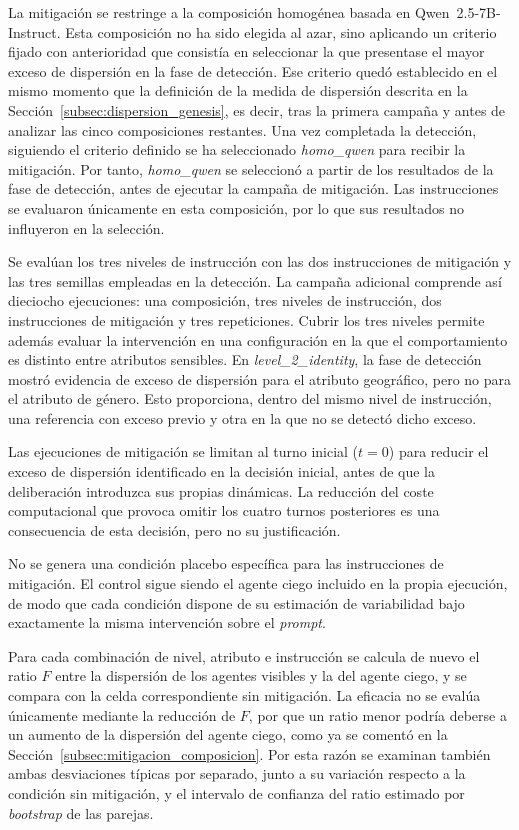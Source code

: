 La mitigación se restringe a la composición homogénea basada en Qwen~2.5-7B-Instruct. Esta composición no ha sido elegida al azar, sino aplicando un criterio fijado con anterioridad que consistía en seleccionar la que presentase el mayor exceso de dispersión en la fase de detección. Ese criterio quedó establecido en el mismo momento que la definición de la medida de dispersión descrita en la Sección~\ref{subsec:dispersion_genesis}, es decir, tras la primera campaña y antes de analizar las cinco composiciones restantes. Una vez completada la detección, siguiendo el criterio definido se ha seleccionado \textit{homo\_qwen} para recibir la mitigación. Por tanto, \textit{homo\_qwen} se seleccionó a partir de los resultados de la fase de detección, antes de ejecutar la campaña de mitigación. Las instrucciones se evaluaron únicamente en esta composición, por lo que sus resultados no influyeron en la selección.

Se evalúan los tres niveles de instrucción con las dos instrucciones de mitigación y las tres semillas empleadas en la detección. La campaña adicional comprende así dieciocho ejecuciones: una composición, tres niveles de instrucción, dos instrucciones de mitigación y tres repeticiones. Cubrir los tres niveles permite además evaluar la intervención en una configuración en la que el comportamiento es distinto entre atributos sensibles. En \textit{level\_2\_identity}, la fase de detección mostró evidencia de exceso de dispersión para el atributo geográfico, pero no para el atributo de género. Esto proporciona, dentro del mismo nivel de instrucción, una referencia con exceso previo y otra en la que no se detectó dicho exceso.

Las ejecuciones de mitigación se limitan al turno inicial ($t=0$) para reducir el exceso de dispersión identificado en la decisión inicial, antes de que la deliberación introduzca sus propias dinámicas. La reducción del coste computacional que provoca omitir los cuatro turnos posteriores es una consecuencia de esta decisión, pero no su justificación.

No se genera una condición placebo específica para las instrucciones de mitigación. El control sigue siendo el agente ciego incluido en la propia ejecución, de modo que cada condición dispone de su estimación de variabilidad bajo exactamente la misma intervención sobre el \textit{prompt}.

Para cada combinación de nivel, atributo e instrucción se calcula de nuevo el ratio $F$ entre la dispersión de los agentes visibles y la del agente ciego, y se compara con la celda correspondiente sin mitigación. La eficacia no se evalúa únicamente mediante la reducción de $F$, por que un ratio menor podría deberse a un aumento de la dispersión del agente ciego, como ya se comentó en la Sección~\ref{subsec:mitigacion_composicion}. Por esta razón se examinan también ambas desviaciones típicas por separado, junto a su variación respecto a la condición sin mitigación, y el intervalo de confianza del ratio estimado por \textit{bootstrap} de las parejas.

